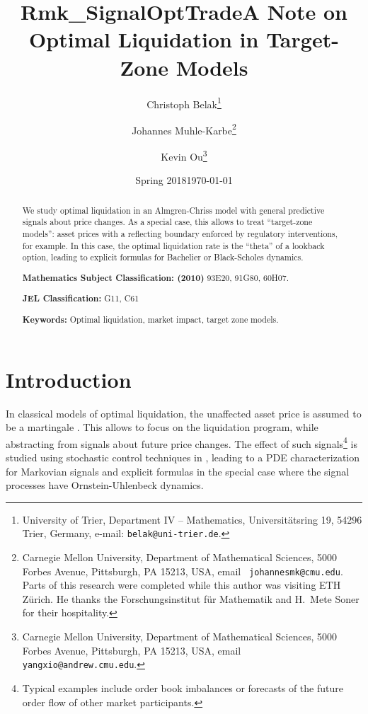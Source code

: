 \documentclass[11pt]{article}
\title{Rmk_SignalOptTrade}
\date{Spring 2018}
\numberwithin{equation}{section}
\theoremstyle{definition}
\theoremstyle{remark}
\begin{document}
\title{A Note on Optimal Liquidation in Target-Zone Models}

\author{
Christoph Belak\thanks{University of Trier, Department IV -- Mathematics, Universit\"atsring 19, 54296 Trier, Germany, e-mail: \texttt{belak@uni-trier.de}.}
\and
Johannes Muhle-Karbe\thanks{Carnegie Mellon University, Department of Mathematical Sciences, 5000 Forbes Avenue, Pittsburgh, PA 15213, USA, email \texttt{ johannesmk@cmu.edu}. Parts of this research were completed while this author was visiting ETH Z\"urich. He thanks the Forschungsinstitut f\"ur Mathematik and H.~Mete Soner for their hospitality. }
\and
Kevin Ou\thanks{Carnegie Mellon University, Department of Mathematical Sciences, 5000 Forbes Avenue, Pittsburgh, PA 15213, USA, email \texttt{ yangxio@andrew.cmu.edu}.}
}

\date{\today}

\maketitle

\begin{abstract}
We study optimal liquidation in an Almgren-Chriss model with general predictive signals about price changes. As a special case, this allows to treat ``target-zone models'': asset prices with a reflecting boundary enforced by regulatory interventions, for example. In this case, the optimal liquidation rate is the ``theta'' of a lookback option, leading to explicit formulas for Bachelier or Black-Scholes dynamics.
 
\bigskip
\noindent\textbf{Mathematics Subject Classification: (2010)} 93E20, 91G80, 60H07.

\bigskip
\noindent\textbf{JEL Classification:} G11, C61

\bigskip
\noindent\textbf{Keywords:} Optimal liquidation, market impact, target zone models.

\end{abstract}




\section{Introduction}

In classical models of optimal liquidation, the unaffected asset price is assumed to be a martingale \cite{bertsimas.lo.98,almgren2001optimal,obizhaeva.wang.13,alfonsi.al.10,predoiu.al.11}. This allows to focus on the liquidation program, while abstracting from signals about future price changes. The effect of such signals\footnote{Typical examples include order book imbalances or forecasts of the future order flow of other market participants.} is studied using stochastic control techniques in \cite{cartea.jaimungal.16,lehalle2017incorporating}, leading to a PDE characterization for Markovian signals and explicit formulas in the special case where the signal processes have Ornstein-Uhlenbeck dynamics. 
\end{document}

